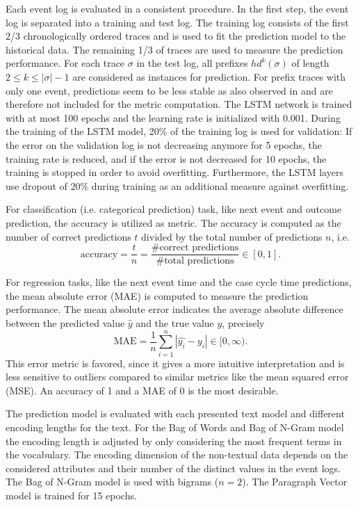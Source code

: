 Each event log is evaluated in a consistent procedure.
In the first step, the event log is separated into a training and test log. 
The training log consists of the first 2/3 chronologically ordered traces and is used to fit the prediction model to the historical data.
The remaining 1/3 of traces are used to measure the prediction performance.
For each trace $\sigma$ in the test log, all prefixes $hd^k(\sigma)$ of length $2 \leq k \leq |\sigma| - 1$ are considered as instances for prediction.
For prefix traces with only one event, predictions seem to be less stable as also observed in \cite{DBLP:conf/caise/TaxVRD17} and are therefore not included for the metric computation.
The LSTM network is trained with at most 100 epochs and the learning rate is initialized with 0.001.
During the training of the LSTM model, 20\% of the training log is used for validation: If the error on the validation log is not decreasing anymore for 5 epochs, the training rate is reduced, and if the error is not decreased for 10 epochs, the training is stopped in order to avoid overfitting.
Furthermore, the LSTM layers use dropout \cite{DBLP:journals/corr/abs-1207-0580} of 20\% during training as an additional measure against overfitting.

For classification (i.e. categorical prediction) task, like next event and outcome prediction, the accuracy is utilized as metric.
The accuracy is computed as the number of correct predictions $t$ divided by the total number of predictions $n$, i.e. 
\begin{equation*}
	\textrm{accuracy} = \dfrac{t}{n} = \dfrac{\textrm{\# correct predictions}}{\textrm{\# total predictions}} \in [0,1].
\end{equation*}

For regression tasks, like the next event time and the case cycle time predictions, the mean absolute error (MAE) is computed to measure the prediction performance. The mean absolute error indicates the average absolute difference between the predicted value $\hat{y}$ and the true value $y$,  precisely
\begin{equation*}
	\textrm{MAE} = \dfrac{1}{n}\sum_{i=1}^{n}|\hat{y_i} - y_i| \in [0, \infty).
\end{equation*}
This error metric is favored, since it gives a more intuitive interpretation and is less sensitive to outliers compared to similar metrics like the mean squared error (MSE).
An accuracy of 1 and a MAE of 0 is the most desirable.

The prediction model is evaluated with each presented text model and different encoding lengths for the text.
For the Bag of Words and Bag of N-Gram model the encoding length is adjusted by only considering the most frequent terms in the vocabulary.
The encoding dimension of the non-textual data depends on the considered attributes and their number of the distinct values in the event logs.
The Bag of N-Gram model is used with bigrams ($n=2$).
The Paragraph Vector model is trained for 15 epochs.

